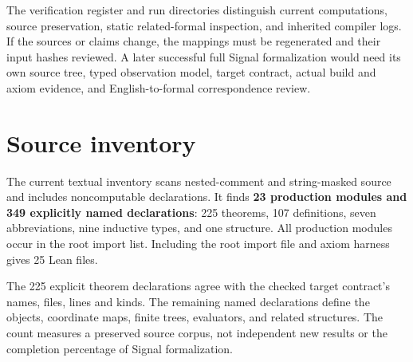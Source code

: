 \documentclass[11pt]{article}
\begin{document}
The verification register and run directories distinguish current computations, source preservation, static related-formal inspection, and inherited compiler logs. If the sources or claims change, the mappings must be regenerated and their input hashes reviewed. A later successful full Signal formalization would need its own source tree, typed observation model, target contract, actual build and axiom evidence, and English-to-formal correspondence review.

\hypertarget{source-inventory}{%
\section{Source inventory}\label{source-inventory}}

The current textual inventory scans nested-comment and string-masked source and includes noncomputable declarations. It finds \textbf{23 production modules and 349 explicitly named declarations}: 225 theorems, 107 definitions, seven abbreviations, nine inductive types, and one structure. All production modules occur in the root import list. Including the root import file and axiom harness gives 25 Lean files.

The 225 explicit theorem declarations agree with the checked target contract's names, files, lines and kinds. The remaining named declarations define the objects, coordinate maps, finite trees, evaluators, and related structures. The count measures a preserved source corpus, not independent new results or the completion percentage of Signal formalization.
\end{document}
